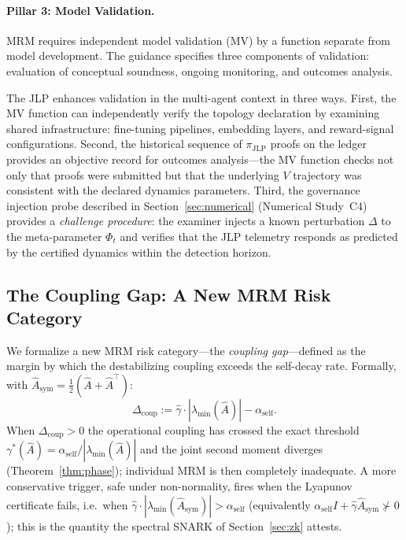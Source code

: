 \documentclass[12pt]{article}
\theoremstyle{plain}
\theoremstyle{definition}
\newcommand{\abs}[1]{\left| #1 \right|}
\begin{document}
\paragraph{Pillar 3: Model Validation.}

MRM requires independent model validation (MV) by a function
separate from model development.  The guidance specifies three
components of validation: evaluation of conceptual soundness,
ongoing monitoring, and outcomes analysis.

The JLP enhances validation in the multi-agent context in three ways.
First, the MV function can independently verify the topology declaration
by examining shared infrastructure: fine-tuning pipelines, embedding
layers, and reward-signal configurations.  Second, the historical
sequence of $\pi_{\mathrm{JLP}}$ proofs on the ledger provides an
objective record for outcomes analysis---the MV function checks not
only that proofs were submitted but that the underlying $V$ trajectory
was consistent with the declared dynamics parameters.  Third, the
governance injection probe described in Section~\ref{sec:numerical}
(Numerical Study~C4) provides a \emph{challenge procedure}: the
examiner injects a known perturbation $\Delta$ to the meta-parameter
$\Phi_t$ and verifies that the JLP telemetry responds as predicted by
the certified dynamics within the detection horizon.

\subsection{The Coupling Gap: A New MRM Risk Category}

We formalize a new MRM risk
category---the \emph{coupling gap}---defined as the margin by which the
destabilizing coupling exceeds the self-decay rate.  Formally, with
$\hat A_{\mathrm{sym}}=\tfrac12(\hat A+\hat A^\top)$:
\begin{equation}
  \Delta_{\mathrm{coup}} := \hat\gamma \cdot \abs{\lambda_{\min}(\hat A)} - \alpha_{\mathrm{self}}.
  \label{eq:coupling_gap}
\end{equation}
When $\Delta_{\mathrm{coup}} > 0$ the operational coupling has crossed the
exact threshold $\gamma^*(\hat A)=\alpha_{\mathrm{self}}/\abs{\lambda_{\min}(\hat A)}$
and the joint second moment diverges (Theorem~\ref{thm:phase}); individual
MRM is then completely inadequate.  A more conservative trigger, safe under
non-normality, fires when the Lyapunov certificate fails, i.e.\ when
$\hat\gamma\cdot\abs{\lambda_{\min}(\hat A_{\mathrm{sym}})}>\alpha_{\mathrm{self}}$
(equivalently $\alpha_{\mathrm{self}}I+\hat\gamma\hat A_{\mathrm{sym}}\not\succ0$);
this is the quantity the spectral SNARK of Section~\ref{sec:zk} attests.
\end{document}
